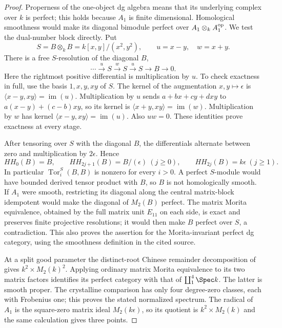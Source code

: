 \begin{proof}
Properness of the one-object dg algebra means that its underlying
complex over $k$ is perfect; this holds because $A_1$ is finite
dimensional. Homological smoothness would make its diagonal bimodule
perfect over $A_1\otimes_k A_1^{\rm op}$.
We test the dual-number block directly.
Put
\[
 S=B\otimes_k B=k[x,y]/(x^2,y^2),\qquad
 u=x-y,\quad w=x+y.
\]
There is a free $S$-resolution of the diagonal $B$,
\[
 \cdots\xrightarrow{u}S\xrightarrow{w}S
       \xrightarrow{u}S\longrightarrow B\longrightarrow0.
\]
Here the rightmost positive differential is multiplication by $u$.
To check exactness in full, use the basis $1,x,y,xy$ of $S$.
The kernel of the augmentation $x,y\mapsto\epsilon$ is
$\langle x-y,xy\rangle=\operatorname{im}(u)$.
Multiplication by $u$ sends
$a+bx+cy+dxy$ to $a(x-y)+(c-b)xy$, so its kernel is
$\langle x+y,xy\rangle=\operatorname{im}(w)$.
Multiplication by $w$ has kernel
$\langle x-y,xy\rangle=\operatorname{im}(u)$.
Also $uw=0$. These identities prove exactness at every stage.

After tensoring over $S$ with the diagonal $B$, the differentials
alternate between zero and multiplication by $2\epsilon$. Hence
\[
 HH_0(B)=B,\qquad
 HH_{2j+1}(B)=B/(\epsilon)\ (j\ge0),\qquad
 HH_{2j}(B)=k\epsilon\ (j\ge1).
\]
In particular $\operatorname{Tor}^{S}_i(B,B)$ is nonzero for
every $i>0$. A perfect $S$-module would have bounded derived tensor
product with $B$, so $B$ is not homologically smooth.
If $A_1$ were smooth, restricting its diagonal along the central
matrix-block idempotent would make the diagonal of $M_2(B)$
perfect. The matrix Morita equivalence, obtained by the full matrix
unit $E_{11}$ on each side, is exact and preserves finite projective
resolutions; it would then make $B$ perfect over $S$, a contradiction.
This also proves the assertion for the Morita-invariant perfect dg
category, using the smoothness definition in the cited source.

At a split good parameter the distinct-root Chinese remainder
decomposition of  gives $k^2\times M_2(k)^2$.
Applying ordinary matrix Morita equivalence to its two matrix factors
identifies its perfect category with that of $\coprod_1^4\Spec k$.
The latter is smooth proper. The crystalline comparison
\cite[\S7, equations~(7.1)--(7.4), p.~17]{TabuadaWeil}
has only four degree-zero classes, each with Frobenius one; this
proves the stated normalized spectrum. The radical of $A_1$ is
the square-zero matrix ideal $M_2(k\epsilon)$, so its quotient is
$k^2\times M_2(k)$ and the same calculation gives three points.
\end{proof}

